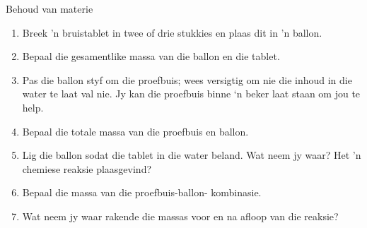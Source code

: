\begin{i_experiment}{Behoud van materie}
\begin{minipage}{.6\textwidth}
\begin{enumerate}[noitemsep, label=\textbf{\arabic*}. ]
\item Breek 'n bruistablet in twee of drie stukkies en plaas dit in 'n ballon.
\item Bepaal die gesamentlike massa van die ballon en die tablet.
\item Pas die ballon styf om die proefbuis; wees versigtig om nie die inhoud in die water te laat val nie. Jy kan die proefbuis binne ‘n beker laat staan om jou te help.
\item Bepaal die totale massa van die proefbuis en ballon.
\item Lig die ballon sodat die tablet in die water beland. Wat neem jy waar? Het 'n chemiese reaksie plaasgevind?
\item Bepaal die massa van die proefbuis-ballon- kombinasie.
\item Wat neem jy waar rakende die massas voor en na afloop van die reaksie?
\end{enumerate}
\end{minipage}
\begin{minipage}{.4\textwidth}
 \begin{center}
\end{center}
\end{minipage}
\end{i_experiment}
